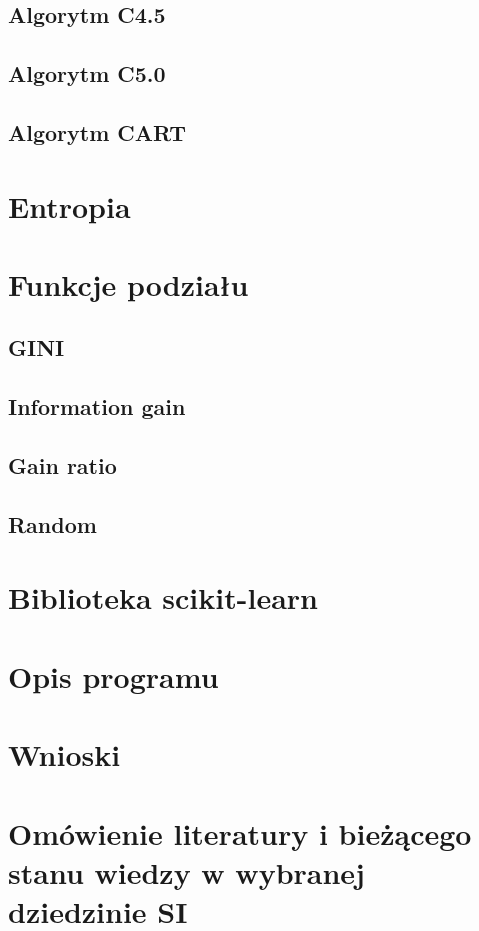 \documentclass[10pt,a4paper]{article}
\begin{document}
\subsection{Algorytm C4.5}
\subsection{Algorytm C5.0}
\subsection{Algorytm CART}

\section{Entropia}

\section{Funkcje podziału}
\subsection{GINI}
\subsection{Information gain}
\subsection{Gain ratio}
\subsection{Random}

\section{Biblioteka scikit-learn}

\section{Opis programu}

\section{Wnioski}

\section{Omówienie literatury i bieżącego stanu wiedzy w wybranej dziedzinie SI}
\end{document}
